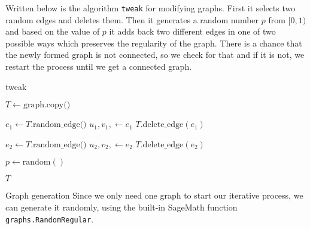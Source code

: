 \documentclass[12pt,a4paper]{amsart}
\makeatletter
\renewcommand\subsection{\@startsection{subsection}{2}
  \z@{.5\linespacing\@plus.7\linespacing}{.5\linespacing}
  {\normalfont\scshape}}
\theoremstyle{definition} %
\theoremstyle{plain} %
\makeatother
\begin{document}
    Written below is the algorithm \texttt{tweak} for modifying graphs. First it selects two random edges and deletes them. Then it generates a random number $p$ from $[0, 1)$ and based on the value of $p$ it adds back two different edges in one of two possible ways which preserves the regularity of the graph. There is a chance that the newly formed graph is not connected, so we check for that and if it is not, we restart the process until we get a connected graph.\\
    \begin{algorithm}[!htbp]
        \caption{tweak}\label{algo:tweakGraph}
        \LinesNumberedHidden
        \DontPrintSemicolon
        
        
        

            $T \gets \text{graph.copy()}$\;
            
            $e_1 \gets T.\text{random\_edge()}$\;
            $u_1, v_1, \gets e_1$\;
            $T.\text{delete\_edge}(e_1)$\;
            
            $e_2 \gets T.\text{random\_edge()}$\;
            $u_2, v_2,  \gets e_2$\;
            $T.\text{delete\_edge}(e_2)$\;
        
            $p \gets \text{random}()$\;
            
            
            \Return $T$\;
        \end{algorithm}

    \subsection{Graph generation}
        Since we only need one graph to start our iterative process, we can generate it randomly, using the built-in SageMath function \texttt{graphs.RandomRegular}.
\end{document}
